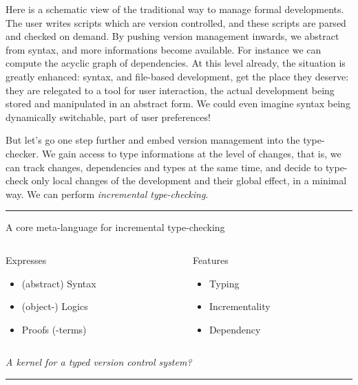 \documentclass[ignorenonframetext,red]{beamer}
\begin{document}
Here is a schematic view of the traditional way to manage formal
developments. The user writes scripts which are version controlled,
and these scripts are parsed and checked on demand. By pushing version
management inwards, we abstract from syntax, and more informations
become available. For instance we can compute the acyclic graph of
dependencies. At this level already, the situation is greatly
enhanced: syntax, and file-based development, get the place they
deserve: they are relegated to a tool for user interaction, the actual
development being stored and manipulated in an abstract form. We could
even imagine syntax being dynamically switchable, part of user
preferences!

But let's go one step further and embed version management into the
type-checker. We gain access to type informations at the level of
changes, that is, we can track changes, dependencies and types at the
same time, and decide to type-check only local changes of the
development and their global effect, in a minimal way. We can perform
\emph{incremental type-checking}.

\hrule
\begin{frame}{A core meta-language for incremental type-checking}
  \begin{columns}[t]
    \begin{column}{0.5\textwidth}
      \begin{block}{Expresses}
        \begin{itemize}
        \item (abstract) Syntax
        \item (object-) Logics
        \item Proofs (-terms)
        \end{itemize}
      \end{block}
    \end{column}
    \begin{column}{0.5\textwidth}
      \begin{block}{Features}
        \begin{itemize}
        \item Typing
        \item Incrementality
        \item Dependency
        \end{itemize}
      \end{block}
    \end{column}
  \end{columns}
  \vspace{2em}
  \begin{center}
    \emph{A kernel for a typed version control system?}
  \end{center}
\end{frame}
\hrule
\end{document}
